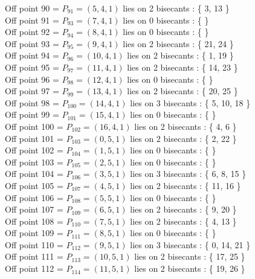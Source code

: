 \documentclass{article}
\begin{document}
{Off point 90 = $P_{91} = ( 5, 4, 1 )$ lies on 2 bisecants : \{ 3, 13 \}\\
Off point 91 = $P_{93} = ( 7, 4, 1 )$ lies on 0 bisecants : \{  \}\\
Off point 92 = $P_{94} = ( 8, 4, 1 )$ lies on 0 bisecants : \{  \}\\
Off point 93 = $P_{95} = ( 9, 4, 1 )$ lies on 2 bisecants : \{ 21, 24 \}\\
Off point 94 = $P_{96} = ( 10, 4, 1 )$ lies on 2 bisecants : \{ 1, 19 \}\\
Off point 95 = $P_{97} = ( 11, 4, 1 )$ lies on 2 bisecants : \{ 14, 23 \}\\
Off point 96 = $P_{98} = ( 12, 4, 1 )$ lies on 0 bisecants : \{  \}\\
Off point 97 = $P_{99} = ( 13, 4, 1 )$ lies on 2 bisecants : \{ 20, 25 \}\\
Off point 98 = $P_{100} = ( 14, 4, 1 )$ lies on 3 bisecants : \{ 5, 10, 18 \}\\
Off point 99 = $P_{101} = ( 15, 4, 1 )$ lies on 0 bisecants : \{  \}\\
Off point 100 = $P_{102} = ( 16, 4, 1 )$ lies on 2 bisecants : \{ 4, 6 \}\\
Off point 101 = $P_{103} = ( 0, 5, 1 )$ lies on 2 bisecants : \{ 2, 22 \}\\
Off point 102 = $P_{104} = ( 1, 5, 1 )$ lies on 0 bisecants : \{  \}\\
Off point 103 = $P_{105} = ( 2, 5, 1 )$ lies on 0 bisecants : \{  \}\\
Off point 104 = $P_{106} = ( 3, 5, 1 )$ lies on 3 bisecants : \{ 6, 8, 15 \}\\
Off point 105 = $P_{107} = ( 4, 5, 1 )$ lies on 2 bisecants : \{ 11, 16 \}\\
Off point 106 = $P_{108} = ( 5, 5, 1 )$ lies on 0 bisecants : \{  \}\\
Off point 107 = $P_{109} = ( 6, 5, 1 )$ lies on 2 bisecants : \{ 9, 20 \}\\
Off point 108 = $P_{110} = ( 7, 5, 1 )$ lies on 2 bisecants : \{ 4, 13 \}\\
Off point 109 = $P_{111} = ( 8, 5, 1 )$ lies on 0 bisecants : \{  \}\\
Off point 110 = $P_{112} = ( 9, 5, 1 )$ lies on 3 bisecants : \{ 0, 14, 21 \}\\
Off point 111 = $P_{113} = ( 10, 5, 1 )$ lies on 2 bisecants : \{ 17, 25 \}\\
Off point 112 = $P_{114} = ( 11, 5, 1 )$ lies on 2 bisecants : \{ 19, 26 \}\\
}
\end{document}

